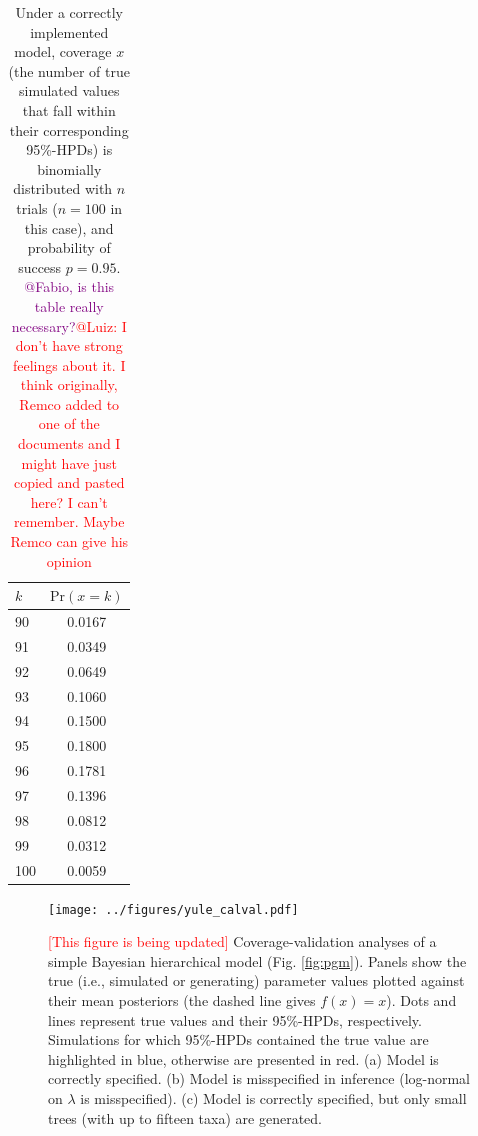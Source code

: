 \documentclass[oneside]{article}
\begin{document}
\begin{table}
\begin{center}
\begin{tabular}{l|c}
\hline
$k$ & $\text{Pr}(x=k)$ \\ %
\hline
90 & 0.0167 \\ %
91 & 0.0349 \\ %
92 & 0.0649 \\ %
93 & 0.1060 \\ %
94 & 0.1500 \\ %
95 & 0.1800 \\ %
96 & 0.1781 \\ %
97 & 0.1396 \\ %
98 & 0.0812 \\ %
99 & 0.0312 \\ %
100 & 0.0059 \\ %
\hline
\end{tabular}
\end{center}
\caption{Under a correctly implemented model, coverage $x$ (the number
  of true simulated values that fall within their corresponding 95\%-HPDs)
  is binomially distributed with $n$ trials ($n=100$ in this case),
  and probability of success $p=0.95$.
  \textcolor{purple}{@Fabio, is this table really necessary?}\textcolor{red}{@Luiz: I don't have strong feelings about it. I think originally, Remco added to one of the documents and I might have just copied and pasted here? I can't remember. Maybe Remco can give his opinion}
  }
\label{tab:coverage}
\end{table}


\begin{figure}
  \texttt{[image: ../figures/yule\_calval.pdf]}
  \caption{\textcolor{red}{[This figure is being updated]}
    Coverage-validation analyses of a simple Bayesian
    hierarchical model (Fig. \ref{fig:pgm}). Panels show the true
    (i.e., simulated or generating) parameter values plotted
    against their mean posteriors (the dashed line gives $f(x) = x$).
    Dots and lines represent true values and their 95\%-HPDs,
    respectively.
    Simulations for which 95\%-HPDs contained the true value are
    highlighted in blue, otherwise are presented in red.
    (a) Model is correctly specified. (b) Model is misspecified
    in inference (log-normal on $\lambda$ is misspecified).
    (c) Model is correctly specified, but only small trees (with
    up to fifteen taxa) are generated.
  }
  \label{fig:yulecalval}
\end{figure}
\end{document}
